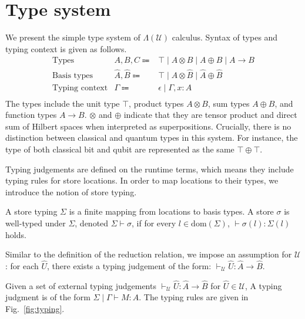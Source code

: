 \section{Type system} \label{sec:type-system}
We present the simple type system of $\Lambda(\mathcal{U})$ calculus.
Syntax of types and typing context is given as follows.
\begin{equation*}
  \begin{array}{lrl}
    \text{Types}          & A, B, C \Coloneqq          & \top\mid A\otimes B\mid A\oplus B\mid A\rightarrow B    \\
    \text{Basis types}    & \hat{A}, \hat{B} \Coloneqq & \top\mid\hat{A}\otimes \hat{B}\mid\hat{A}\oplus \hat{B} \\
    \text{Typing context} & \Gamma \Coloneqq           & \epsilon \mid \Gamma,x:A                                \\
  \end{array}
\end{equation*}
The types include the unit type $\top$, product types $A \otimes B$, sum types $A \oplus B$, and function types $A \rightarrow B$.
$\otimes$ and $\oplus$ indicate that they are tensor product and direct sum of Hilbert spaces when interpreted as superpositions.
Crucially, there is no distinction between classical and quantum types in this system.
For instance, the type of both classical bit and qubit are represented as the same $\top \oplus \top$.

Typing judgements are defined on the runtime terms, which means they include typing rules for store locations.
In order to map locations to their types, we introduce the notion of store typing.
\begin{dfn}
  A store typing $\Sigma$ is a finite mapping from locations to basis types.
  A store $\sigma$ is well-typed under $\Sigma$, denoted $\Sigma \vdash \sigma$, if for every $l\in\text{dom}(\Sigma)$, $\vdash \sigma(l) : \Sigma(l)$ holds.
\end{dfn}

Similar to the definition of the reduction relation, we impose an assumption for $\mathcal{U}$ : for each $\hat{U}$, there exists a typing judgement of the form: $\vdash_\mathcal{U} \hat{U} : \hat{A} \rightarrow \hat{B}$.
\begin{dfn}
  Given a set of external typing judgements $\vdash_\mathcal{U} \hat{U} : \hat{A} \rightarrow \hat{B}$ for $\hat{U}\in\mathcal{U}$,
  A typing judgment is of the form $\Sigma \mid \Gamma \vdash M : A$.
  The typing rules are given in Fig.~\ref{fig:typing}.
\end{dfn}

